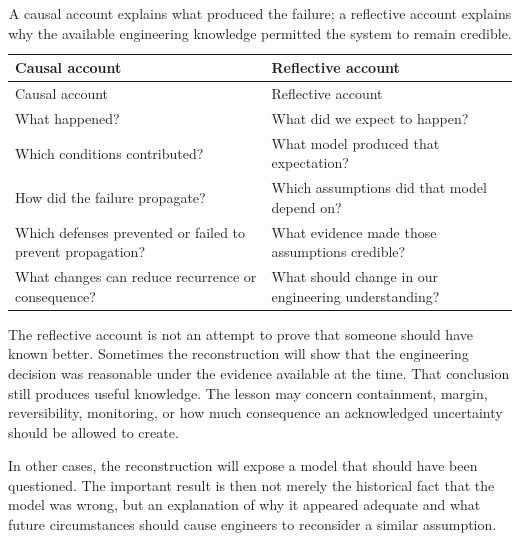 \begin{longtable}[]{@{}
  >{\raggedright\arraybackslash}p{}
  >{\raggedright\arraybackslash}p{}@{}}
\caption{A causal account explains what produced the failure; a reflective account explains why the
available engineering knowledge permitted the system to remain credible.}\label{tbl-causal-reflective}\tabularnewline
\toprule\noalign{}
\begin{minipage}[b]{\linewidth}\raggedright
Causal account
\end{minipage} & \begin{minipage}[b]{\linewidth}\raggedright
Reflective account
\end{minipage} \\
\midrule\noalign{}
\endfirsthead
\toprule\noalign{}
\begin{minipage}[b]{\linewidth}\raggedright
Causal account
\end{minipage} & \begin{minipage}[b]{\linewidth}\raggedright
Reflective account
\end{minipage} \\
\midrule\noalign{}
\endhead
\bottomrule\noalign{}
\endlastfoot
What happened? & What did we expect to happen? \\
Which conditions contributed? & What model produced that expectation? \\
How did the failure propagate? & Which assumptions did that model depend on? \\
Which defenses prevented or failed to prevent propagation? & What evidence made those assumptions credible? \\
What changes can reduce recurrence or consequence? & What should change in our engineering understanding? \\
\end{longtable}

The reflective account is not an attempt to prove that someone should have known better. Sometimes
the reconstruction will show that the engineering decision was reasonable under the evidence
available at the time. That conclusion still produces useful knowledge. The lesson may concern
containment, margin, reversibility, monitoring, or how much consequence an acknowledged uncertainty
should be allowed to create.

In other cases, the reconstruction will expose a model that should have been questioned. The
important result is then not merely the historical fact that the model was wrong, but an
explanation of why it appeared adequate and what future circumstances should cause engineers to
reconsider a similar assumption.

